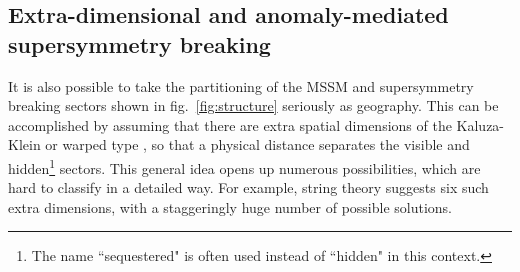 \documentclass[12pt]{article}
\begin{document}
\subsection{Extra-dimensional and anomaly-mediated
supersymmetry breaking}\label{subsec:origins.amsb}
\setcounter{equation}{0}
\setcounter{footnote}{1}

It is also possible to take the partitioning of the MSSM and supersymmetry 
breaking sectors shown in fig.~\ref{fig:structure} seriously as geography. 
This can be accomplished by assuming that there are extra spatial 
dimensions of 
the Kaluza-Klein or warped type \cite{warped}, so that a physical distance 
separates the visible and hidden\footnote{The name ``sequestered" is often 
used instead of ``hidden" in this context.} sectors.  This general idea 
opens up numerous possibilities, which are hard to classify in a detailed 
way. For example, string theory suggests six such extra dimensions, with 
a staggeringly huge number of possible solutions.
\end{document}
